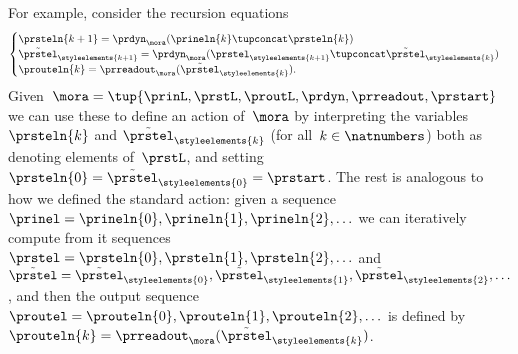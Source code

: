 For example, consider the recursion equations
\begin{equation}
    \label{eq:moore-new-recursion-equations}
    \begin{cases}
        \prsteln{k+1} = \prdyn_\mora(\prineln{k} \tupconcat \prsteln{k})                                                                   \\
        \tilde{\prstel}_{\styleelements{k+1}} = \prdyn_\mora(\prstel_{\styleelements{k+1}} \tupconcat \tilde{\prstel}_{\styleelements{k}}) \\
        \prouteln{k}   = \prreadout_\mora(\tilde{\prstel}_{\styleelements{k}}).
    \end{cases}
\end{equation}
Given~$\mora = \tup{\prinL,\prstL,\proutL,\prdyn,\prreadout,\prstart}$ we can use these to define an action of~$\mora$ by interpreting the variables~$\prsteln{k}$ and $\tilde{\prstel}_\styleelements{k}$ (for all~$k \in \natnumbers$) both as denoting elements of~$\prstL$, and setting~$\prsteln{0} = \tilde{\prstel}_\styleelements{0} = \prstart$.
The rest is analogous to how we defined the standard action:
given a sequence~$\prinel = \prineln{0}, \prineln{1}, \prineln{2}, \ldots$ we can iteratively compute from it sequences~$\prstel = \prsteln{0}, \prsteln{1}, \prsteln{2}, \ldots$ and~$\tilde \prstel = \tilde{\prstel}_\styleelements{0}, \tilde{\prstel}_\styleelements{1}, \tilde{\prstel}_\styleelements{2}, \ldots$, and then the output sequence~$\proutel = \prouteln{0}, \prouteln{1}, \prouteln{2}, \ldots$ is defined by~$\prouteln{k}   = \prreadout_\mora(\tilde{\prstel}_{\styleelements{k}})$.

